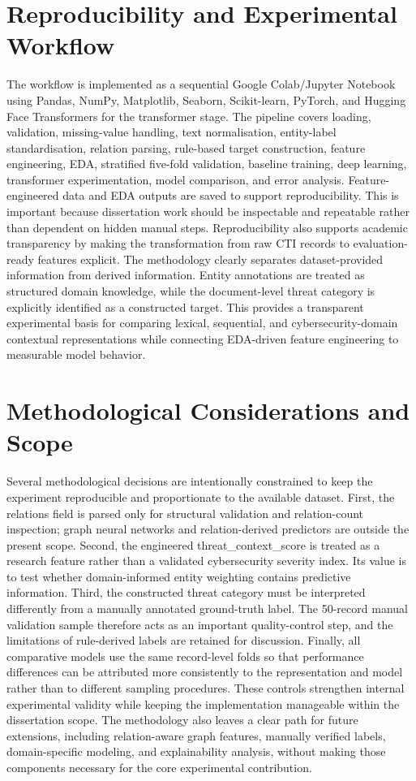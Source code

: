 \documentclass[12pt,a4paper]{report}
\begin{document}
\section{Reproducibility and Experimental
Workflow}\label{reproducibility-and-experimental-workflow}

The workflow is implemented as a sequential Google Colab/Jupyter
Notebook using Pandas, NumPy, Matplotlib, Seaborn, Scikit-learn,
PyTorch, and Hugging Face Transformers for the transformer stage. The
pipeline covers loading, validation, missing-value handling, text
normalisation, entity-label standardisation, relation parsing,
rule-based target construction, feature engineering, EDA, stratified
five-fold validation, baseline training, deep learning, transformer
experimentation, model comparison, and error analysis.
Feature-engineered data and EDA outputs are saved to support
reproducibility. This is important because dissertation work should be
inspectable and repeatable rather than dependent on hidden manual steps.
Reproducibility also supports academic transparency by making the
transformation from raw CTI records to evaluation-ready features
explicit. The methodology clearly separates dataset-provided information
from derived information. Entity annotations are treated as structured
domain knowledge, while the document-level threat category is explicitly
identified as a constructed target. This provides a transparent
experimental basis for comparing lexical, sequential, and
cybersecurity-domain contextual representations while connecting
EDA-driven feature engineering to measurable model behavior.
\section{Methodological Considerations and
Scope}\label{methodological-considerations-and-scope}

Several methodological decisions are intentionally constrained to keep
the experiment reproducible and proportionate to the available dataset.
First, the relations field is parsed only for structural validation and
relation-count inspection; graph neural networks and relation-derived
predictors are outside the present scope. Second, the engineered
threat\_context\_score is treated as a research feature rather than a
validated cybersecurity severity index. Its value is to test whether
domain-informed entity weighting contains predictive information. Third,
the constructed threat category must be interpreted differently from a
manually annotated ground-truth label. The 50-record manual validation
sample therefore acts as an important quality-control step, and the
limitations of rule-derived labels are retained for discussion. Finally,
all comparative models use the same record-level folds so that
performance differences can be attributed more consistently to the
representation and model rather than to different sampling procedures.
These controls strengthen internal experimental validity while keeping
the implementation manageable within the dissertation scope. The
methodology also leaves a clear path for future extensions, including
relation-aware graph features, manually verified labels, domain-specific
modeling, and explainability analysis, without making those components
necessary for the core experimental contribution.
\end{document}
